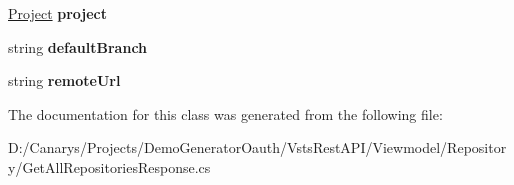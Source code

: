 \begin{DoxyCompactItemize}
\mbox{\hyperlink{class_vsts_rest_a_p_i_1_1_viewmodel_1_1_repository_1_1_get_all_repositories_response_1_1_project}{Project}} {\bfseries project}
\item 
\mbox{\label{class_vsts_rest_a_p_i_1_1_viewmodel_1_1_repository_1_1_get_all_repositories_response_1_1_value_ae1eaf73f86bec8112106e3c84ccd5b0b}} 
string {\bfseries default\+Branch}
\item 
\mbox{\label{class_vsts_rest_a_p_i_1_1_viewmodel_1_1_repository_1_1_get_all_repositories_response_1_1_value_a26df2d3b1a13f5128565f186b13bf7cd}} 
string {\bfseries remote\+Url}
\end{DoxyCompactItemize}


The documentation for this class was generated from the following file\+:\begin{DoxyCompactItemize}
\item 
D\+:/\+Canarys/\+Projects/\+Demo\+Generator\+Oauth/\+Vsts\+Rest\+A\+P\+I/\+Viewmodel/\+Repository/Get\+All\+Repositories\+Response.\+cs\end{DoxyCompactItemize}
